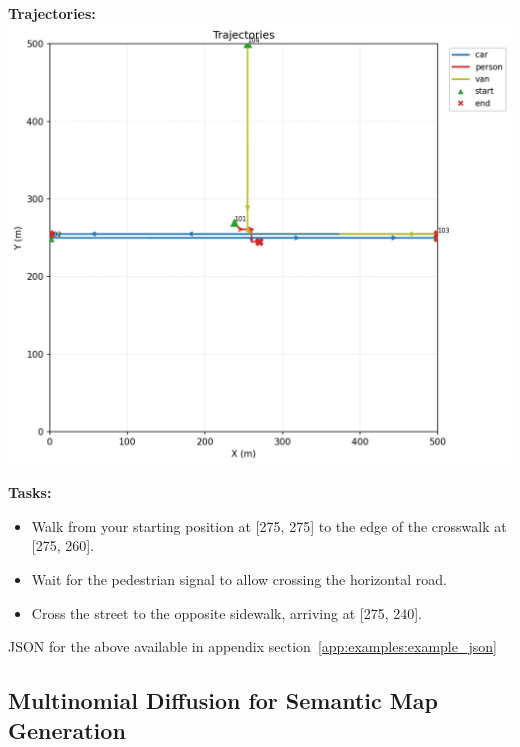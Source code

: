 \documentclass{article}
\begin{document}
\begin{tcolorbox}[examplebox, title=Scene Specification Format]
\textbf{Trajectories:}\\
\includegraphics[width=0.8\linewidth]{images/gemini_dynamic.png}



\textbf{Tasks:}
\begin{itemize}[leftmargin=1.2em]
    \item Walk from your starting position at [275, 275] to the edge of the crosswalk at [275, 260].
    \item Wait for the pedestrian signal to allow crossing the horizontal road.
    \item Cross the street to the opposite sidewalk, arriving at [275, 240].
\end{itemize}

JSON for the above available in appendix section~\ref{app:examples:example_json}


\end{tcolorbox}

\subsection{Multinomial Diffusion for Semantic Map Generation}
\end{document}
